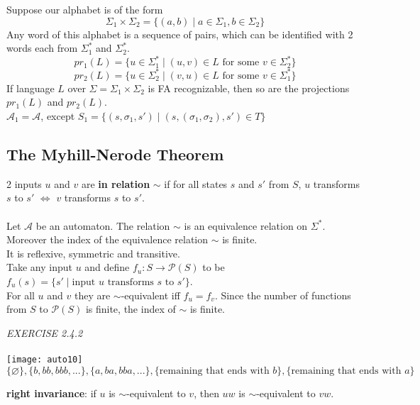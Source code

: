 \documentclass{article}
\begin{document}
Suppose our alphabet is of the form 
\[\Sigma_{1}\times \Sigma_{2}=\{(a,b)\;|\; a\in\Sigma_{1},b\in\Sigma_{2}\}\]
Any word of this alphabet is a sequence of pairs, which can be identified with 2 words each from \(\Sigma_{1}^{*}\) and \(\Sigma_{2}^{*}\).
\[pr_{1}(L)=\{u\in\Sigma_{1}^{*}\;|\;(u,v)\in L\text{ for some }v\in\Sigma_{2}^{*}\}\]
\[pr_{2}(L)=\{u\in\Sigma_{2}^{*}\;|\;(v,u)\in L\text{ for some }v\in\Sigma_{1}^{*}\}\]
\color{red}If language \(L\) over \(\Sigma=\Sigma_{1}\times \Sigma_{2}\) is FA recognizable, then so are the projections \(pr_{1}(L)\) and \(pr_{2}(L)\).\color{black}\\
\(\mathcal{A}_{1}=\mathcal{A}\), except \(S_{1}=\{(s,\sigma_{1},s')\;|\;(s,(\sigma_{1},\sigma_{2}),s')\in T\}\)
\subsection{The Myhill-Nerode Theorem}
2 inputs \(u\) and \(v\) are \textbf{in relation} \(\sim\) if for all states \(s\) and \(s'\) from \(S\), \(u\) transforms \(s\) to \(s'\) \(\Longleftrightarrow\) \(v\) transforms \(s\) to \(s'\).\\\\
\color{red}Let \(\mathcal{A}\) be an automaton. The relation \(\sim\) is an equivalence relation on \(\Sigma^{*}\). Moreover the index of the equivalence relation \(\sim\) is finite.\\\color{black}
It is reflexive, symmetric and transitive.\\
Take any input \(u\) and define \(f_{u}:S\to \mathcal{P}(S)\) to be \(f_{u}(s)=\{s'\;|\;\text{input }u\text{ transforms }s\text{ to }s'\}\).\\
For all \(u\) and \(v\) they are \(\sim\)-equivalent iff \(f_{u}=f_{v}\). Since the number of functions from \(S\) to \(\mathcal{P}(S)\) is finite, the index of \(\sim\) is finite.\\
\begin{siderules}\color{blue}\textit{EXERCISE 2.4.2}\color{black}\\\\
\texttt{[image: auto10]}\\
\(\{\varnothing\}, \{b, bb, bbb,...\}, \{a, ba, bba, ...\},\{\text{remaining that ends with }b\},\{\text{remaining that ends with }a\}\)
\end{siderules}
\textbf{right invariance}: if \(u\) is \(\sim\)-equivalent to \(v\), then \(uw\) is \(\sim\)-equivalent to \(vw\).\\\\
\end{document}
